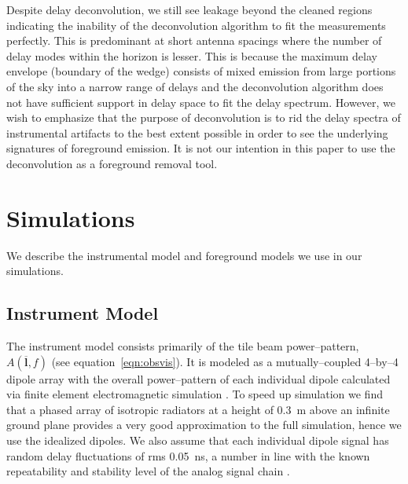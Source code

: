 \documentclass[preprint2,iop,numberedappendix]{emulateapj}
\begin{document}
Despite delay deconvolution, we still see leakage beyond the cleaned regions indicating the inability of the deconvolution algorithm to fit the measurements perfectly. This is predominant at short antenna spacings where the number of delay modes within the horizon is lesser. This is because the maximum delay envelope (boundary of the wedge) consists of mixed emission from large portions of the sky into a narrow range of delays and the deconvolution algorithm does not have sufficient support in delay space to fit the delay spectrum. However, we wish to emphasize that the purpose of deconvolution is to rid the delay spectra of instrumental artifacts to the best extent possible in order to see the underlying signatures of foreground emission. It is not our intention in this paper to use the deconvolution as a foreground removal tool. 

\section{Simulations}\label{sec:modeling}

We describe the instrumental model and foreground models we use in our simulations. 

\subsection{Instrument Model}\label{sec:instrument_model}

The instrument model consists primarily of the tile beam power--pattern, $A(\overline{\mathbf{l}},f)$ (see equation~\ref{eqn:obsvis}). It is modeled as a mutually--coupled 4--by--4 dipole array with the overall power--pattern of each individual dipole calculated via finite element electromagnetic simulation \citep{sut14}. To speed up simulation we find that a phased array of isotropic radiators at a height of 0.3~m above an infinite ground plane provides a very good approximation to the full simulation, hence we use the idealized dipoles. We also assume that each individual dipole signal has random delay fluctuations of rms 0.05~ns, a number in line with the known repeatability and stability level of the analog signal chain \citep{bow07b}.
\end{document}
